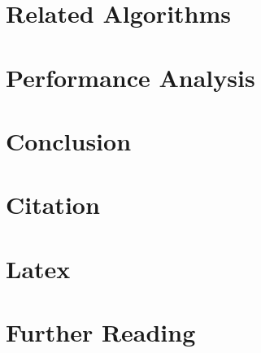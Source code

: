 \documentclass[sigconf]{acmart}
\begin{document}
\section{Related Algorithms}
\label{sec:relatedAlgorithms}


\section{Performance Analysis}
\label {sec:performance}


\section{Conclusion}
\label {sec:conclusion}


\section{Citation}
\label{sec:citation}



\section{Latex}
\label{sec:latex} 


\section{Further Reading}
\label{sec:further}




\end{document}
